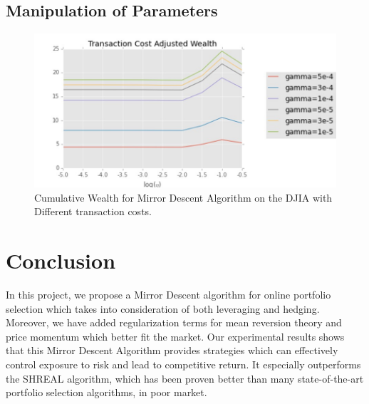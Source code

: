 \subsection{Manipulation of Parameters}

\begin{figure}[!h]
\centering
\includegraphics[width=0.85\columnwidth]{para} 
\caption{Cumulative Wealth for Mirror Descent Algorithm on the DJIA with Different transaction costs.}
\label{S_P500}
\end{figure}

\section{Conclusion}
In this project, we propose a Mirror Descent algorithm for online portfolio selection which takes into consideration of both leveraging and hedging. Moreover, we have added regularization terms for mean reversion theory and price momentum which better fit the market. Our experimental results shows that this Mirror Descent Algorithm provides strategies which can effectively control exposure to risk and lead to competitive return. It especially outperforms the SHREAL algorithm, which has been proven better than many state-of-the-art portfolio selection algorithms, in poor market.



